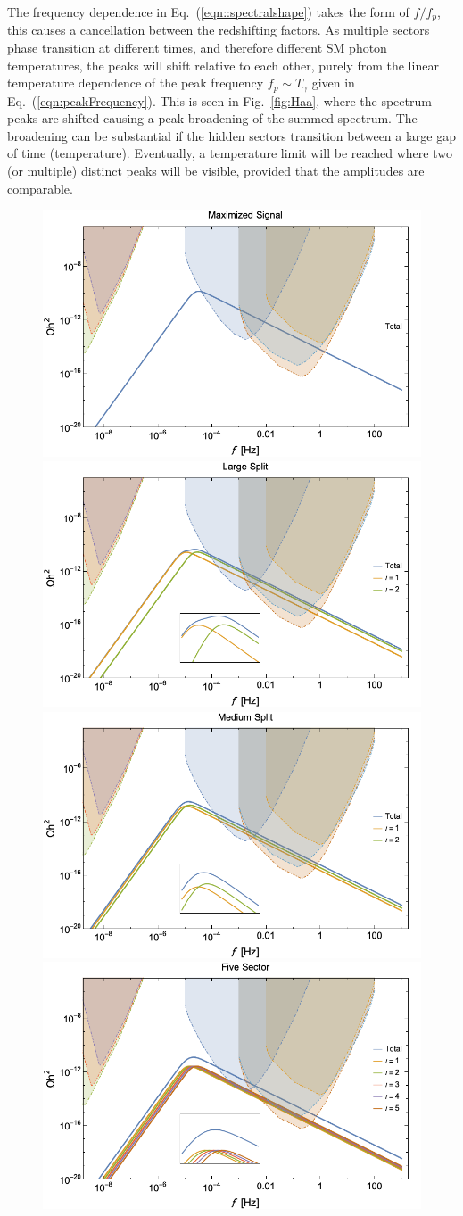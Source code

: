 \documentclass[nofootinbib,twocolumn,preprintnumbers]{revtex4-1}
\begin{document}
The frequency dependence in Eq.~(\ref{eqn::spectralshape}) takes the form of $f/f_{p}$, this causes a cancellation between the redshifting factors. As multiple sectors phase transition at different times, and therefore different SM photon temperatures, the peaks will shift relative to each other, purely from the linear temperature dependence of the peak frequency $f_{p} \sim T_{\gamma}$ given in Eq.~(\ref{eqn:peakFrequency}).  This is seen in Fig.~\ref{fig:Haa}, where the spectrum peaks are shifted causing a peak broadening of the summed spectrum. The broadening can be substantial if the hidden sectors transition between a large gap of time (temperature). Eventually, a temperature limit will be reached where two (or multiple) distinct peaks will be visible, provided that the amplitudes are comparable. 

\begin{figure}[tb]
\centering
\begin{minipage}[c]{\textwidth}
\includegraphics[width=.45\textwidth ]{highest.png}
\hfill
\includegraphics[width=.45\textwidth]{TwoFar.png} 
\hfill
\includegraphics[width=.45\textwidth]{TwoMed.png} 
\hfill
\includegraphics[width=.45\textwidth]{energydensity.png} 

\end{minipage}
\end{figure}
\end{document}
